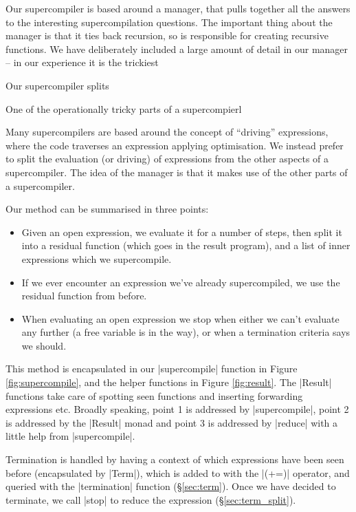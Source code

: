 \documentclass{sigplanconf}
\begin{document}
Our supercompiler is based around a manager, that pulls together all the answers to the interesting supercompilation questions. The important thing about the manager is that it ties back recursion, so is responsible for creating recursive functions. We have deliberately included a large amount of detail in our manager -- in our experience it is the trickiest

Our supercompiler splits 

One of the operationally tricky parts of a supercompierl

Many supercompilers are based around the concept of ``driving'' expressions, where the code traverses an expression applying optimisation. We instead prefer to split the evaluation (or driving) of expressions from the other aspects of a supercompiler. The idea of the manager is that it makes use of the other parts of a supercompiler.

Our method can be summarised in three points:

\begin{itemize}
\item Given an open expression, we evaluate it for a number of steps, then split it into a residual function (which goes in the result program), and a list of inner expressions which we supercompile.
\item If we ever encounter an expression we've already supercompiled, we use the residual function from before.
\item When evaluating an open expression we stop when either we can't evaluate any further (a free variable is in the way), or when a termination criteria says we should.
\end{itemize}

This method is encapsulated in our |supercompile| function in Figure \ref{fig:supercompile}, and the helper functions in Figure \ref{fig:result}. The |Result| functions take care of spotting seen functions and inserting forwarding expressions etc. Broadly speaking, point 1 is addressed by |supercompile|, point 2 is addressed by the |Result| monad and point 3 is addressed by |reduce| with a little help from |supercompile|.

Termination is handled by having a context of which expressions have been seen before (encapsulated by |Term|), which is added to with the |(+=)| operator, and queried with the |termination| function (\S\ref{sec:term}). Once we have decided to terminate, we call |stop| to reduce the expression (\S\ref{sec:term_split}).
\end{document}
